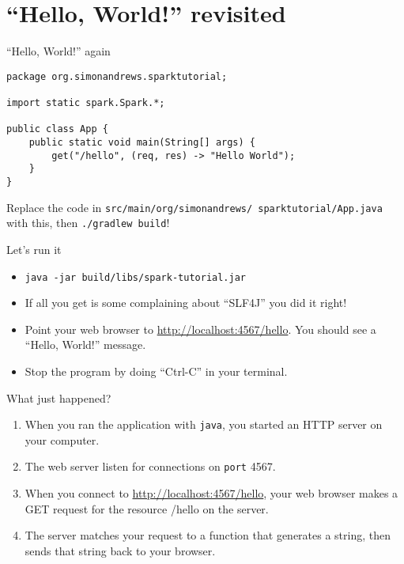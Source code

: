 \section{``Hello, World!'' revisited}

\begin{frame}[fragile]{``Hello, World!'' again}
\begin{verbatim}
package org.simonandrews.sparktutorial;

import static spark.Spark.*;

public class App {
    public static void main(String[] args) {
        get("/hello", (req, res) -> "Hello World");
    }
}
\end{verbatim}
\pause
Replace the code in \texttt{src/main/org/simonandrews/ sparktutorial/App.java} with this, then \texttt{./gradlew build}!
\end{frame}

\begin{frame}{Let's run it}
\begin{itemize}
    \item \texttt{java -jar build/libs/spark-tutorial.jar}
    \item If all you get is some complaining about ``SLF4J'' you did it right!
    \item Point your web browser to \url{http://localhost:4567/hello}. You should see a ``Hello, World!'' message.
    \item Stop the program by doing ``Ctrl-C'' in your terminal.
\end{itemize}
\end{frame}

\begin{frame}{What just happened?}
\begin{enumerate}
    \item When you ran the application with \texttt{java}, you started an HTTP server on your computer.
    \item The web server listen for connections on \texttt{port} 4567.
    \item When you connect to \url{http://localhost:4567/hello}, your web browser makes a GET request for the resource /hello on the server.
    \item The server matches your request to a function that generates a string, then sends that string back to your browser.
\end{enumerate}
\end{frame}
